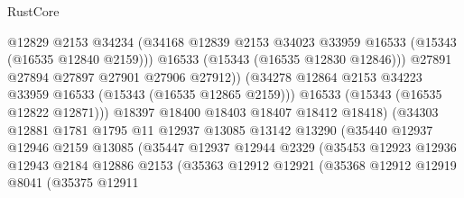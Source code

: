 \begin{lexlean}{RustCore}
\begin{coremodule}
                                  @12829
                                  @2153
                                  @34234
                                  (@34168
                                    @12839
                                    @2153
                                    @34023
                                    @33959
                                    @16533
                                    (@15343 (@16535 @12840 @2159)))
                                  @16533
                                  (@15343 (@16535 @12830 @12846)))
                                @27891
                                @27894
                                @27897
                                @27901
                                @27906
                                @27912))
                            (@34278
                              @12864
                              @2153
                              @34223
                              @33959
                              @16533
                              (@15343 (@16535 @12865 @2159)))
                            @16533
                            (@15343 (@16535 @12822 @12871)))
                          @18397
                          @18400
                          @18403
                          @18407
                          @18412
                          @18418)
                        (@34303
                          @12881
                          @1781
                          @1795
                          @11
                          @12937
                          @13085
                          @13142
                          @13290
                          (@35440
                            @12937
                            @12946
                            @2159
                            @13085
                            (@35447
                              @12937
                              @12944
                              @2329
                              (@35453
                                @12923
                                @12936
                                @12943
                                @2184
                                @12886
                                @2153
                                (@35363
                                  @12912
                                  @12921
                                  (@35368
                                    @12912
                                    @12919
                                    @8041
                                    (@35375
                                      @12911

\end{coremodule}
\end{lexlean}

